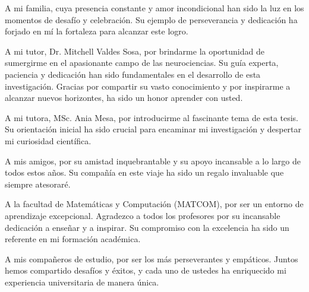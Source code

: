 \begin{acknowledgements}
        
    A mi familia, cuya presencia constante y amor incondicional han sido la luz en los momentos de desafío y celebración. Su ejemplo de perseverancia y dedicación ha forjado en mí la fortaleza para alcanzar este logro. 
       
    A mi tutor, Dr. Mitchell Valdes Sosa, por brindarme la oportunidad de sumergirme en el apasionante campo de las neurociencias. Su guía experta, paciencia y dedicación han sido fundamentales en el desarrollo de esta investigaci\'on. Gracias por compartir su vasto conocimiento y por inspirarme a alcanzar nuevos horizontes, ha sido un honor aprender con usted.
    
    A mi tutora, MSc. Ania Mesa, por introducirme al fascinante tema de esta tesis. Su orientación inicial ha sido crucial para encaminar mi investigación y despertar mi curiosidad científica.
    
     A mis amigos, por su amistad inquebrantable y su apoyo incansable a lo largo de todos estos años. Su compañía en este viaje ha sido un regalo invaluable que siempre atesoraré.
    
    A la facultad de Matemáticas y Computación (MATCOM), por ser un entorno de aprendizaje excepcional. Agradezco a todos los profesores por su incansable dedicación a enseñar y a inspirar. Su compromiso con la excelencia ha sido un referente en mi formación académica.
    
    A mis compañeros de estudio, por ser los más perseverantes y empáticos. Juntos hemos compartido desafíos y éxitos, y cada uno de ustedes ha enriquecido mi experiencia universitaria de manera única.
    
    
\end{acknowledgements}
